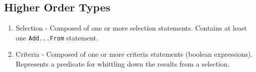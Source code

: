\subsection{Higher Order Types}
\begin{enumerate}
\item Selection - Composed of one or more selection statements. Contains at least one \texttt{Add...From} statement.
\item Criteria - Composed of one or more criteria statements (boolean expressions). Represents a predicate for whittling down the results from a selection. 
\end{enumerate}